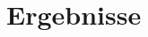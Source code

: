 \chapter{Ergebnisse} %
\label{cha:ergebnisse}
\begin{comment}
	Ergebnisse: Die gewonnen Daten aus Kap. Analyse bewerten.
\end{comment}

